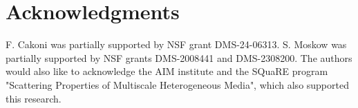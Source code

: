 \documentclass[12pt]{article}
\begin{document}
\section{Acknowledgments} F. Cakoni was partially supported by NSF grant DMS-24-06313. S. Moskow was partially supported by NSF grants DMS-2008441 and DMS-2308200. The authors would also like to acknowledge the AIM institute and the SQuaRE program "Scattering Properties of Multiscale Heterogeneous Media", which also supported this research. 



\end{document}
